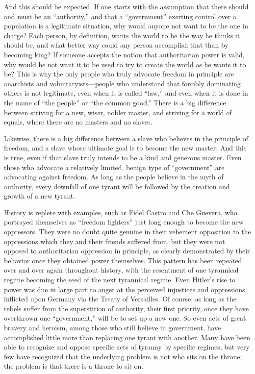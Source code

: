\documentclass{book}
\begin{document}
And this should be expected. If one starts with the assumption that there should and must be an \enquote{authority,} and that a \enquote{government} exerting control over a population is a legitimate situation, why would anyone not want to be the one in charge? Each person, by definition, wants the world to be the way he thinks it should be, and what better way could any person accomplish that than by becoming king? If someone accepts the notion that authoritarian power is valid, why would he not want it to be used to try to create the world as he wants it to be? This is why the only people who truly advocate freedom in principle are anarchists and voluntaryists---people who understand that forcibly dominating others is not legitimate, even when it is called \enquote{law,} and even when it is done in the name of \enquote{the people} or \enquote{the common good.} There is a big difference between striving for a new, wiser, nobler master, and striving for a world of equals, where there are no masters and no slaves.

Likewise, there is a big difference between a slave who believes in the principle of freedom, and a slave whose ultimate goal is to become the new master. And this is true, even if that slave truly intends to be a kind and generous master. Even those who advocate a relatively limited, benign type of \enquote{government} are advocating against freedom. As long as the people believe in the myth of authority, every downfall of one tyrant will be followed by the creation and growth of a new tyrant.

History is replete with examples, such as Fidel Castro and Che Guevera, who portrayed themselves as \enquote{freedom fighters} just long enough to become the new oppressors. They were no doubt quite genuine in their vehement opposition to the oppressions which they and their friends suffered from, but they were not opposed to authoritarian oppression in principle, as clearly demonstrated by their behavior once they obtained power themselves. This pattern has been repeated over and over again throughout history, with the resentment of one tyrannical regime becoming the seed of the next tyrannical regime. Even Hitler's rise to power was due in large part to anger at the perceived injustices and oppressions inflicted upon Germany via the Treaty of Versailles. Of course, as long as the rebels suffer from the superstition of authority, their first priority, once they have overthrown one \enquote{government,} will be to set up a new one. So even acts of great bravery and heroism, among those who still believe in government, have accomplished little more than replacing one tyrant with another. Many have been able to recognize and oppose specific acts of tyranny by specific regimes, but very few have recognized that the underlying problem is not who sits on the throne; the problem is that there is a throne to sit on.
\end{document}
